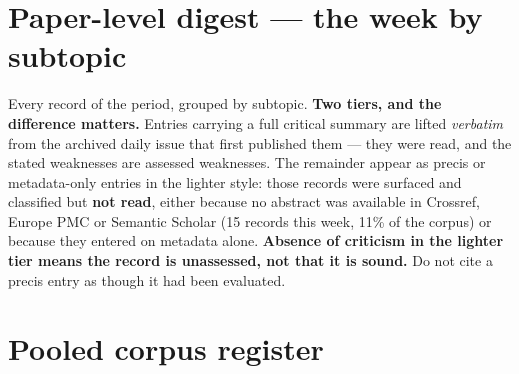 \documentclass[10pt]{article}
\begin{document}
\clearpage

\section*{\sffamily\bfseries\color{Deep}Paper-level digest --- the week by subtopic}
\vspace{-1.5mm}{\color{Teal}\rule{\linewidth}{1.1pt}}\vspace{2mm}

\footnotesize
Every record of the period, grouped by subtopic. \textbf{Two tiers, and the difference
matters.} Entries carrying a full critical summary are lifted \emph{verbatim} from the
archived daily issue that first published them --- they were read, and the stated
weaknesses are assessed weaknesses. The remainder appear as precis or metadata-only
entries in the lighter style: those records were surfaced and classified but
\textbf{not read}, either because no abstract was available in Crossref, Europe PMC or
Semantic Scholar (15 records this week, 11\% of the corpus) or because they entered on
metadata alone. \textbf{Absence of criticism in the lighter tier means the record is
unassessed, not that it is sound.} Do not cite a precis entry as though it had been
evaluated.

\vspace{3mm}



\clearpage

\section*{\sffamily\bfseries\color{Deep}Pooled corpus register}
\vspace{-1.5mm}{\color{Teal}\rule{\linewidth}{1.1pt}}\vspace{2.5mm}


\end{document}
